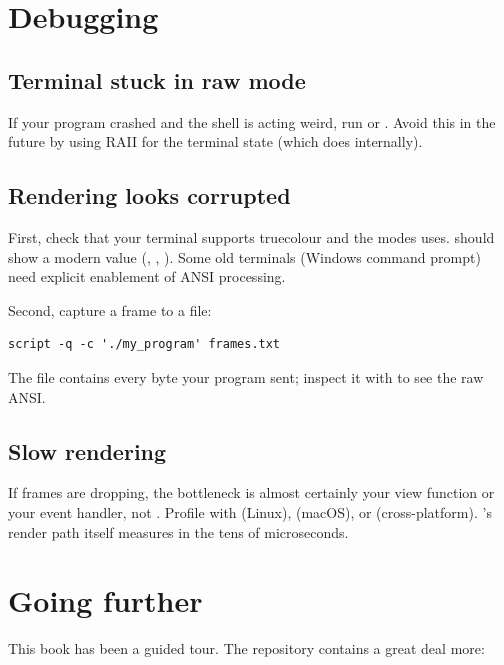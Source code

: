 \section{Debugging}

\subsection{Terminal stuck in raw mode}

If your program crashed and the shell is acting weird, run
 or . Avoid this in the future by using
RAII for the terminal state (which \maya{} does internally).

\subsection{Rendering looks corrupted}

First, check that your terminal supports truecolour and the modes
\maya{} uses.  should show a modern value
(, , ). Some old
terminals (Windows command prompt) need explicit enablement of
ANSI processing.

Second, capture a frame to a file:

\begin{lstlisting}[style=shell]
script -q -c './my_program' frames.txt
\end{lstlisting}

The  file contains every byte your program sent;
inspect it with  to see the raw ANSI.

\subsection{Slow rendering}

If frames are dropping, the bottleneck is almost certainly your
view function or your event handler, not \maya{}. Profile with
 (Linux),  (macOS), or
 (cross-platform). \maya{}'s render path itself
measures in the tens of microseconds.

\section{Going further}

This book has been a guided tour. The repository contains a great
deal more:

